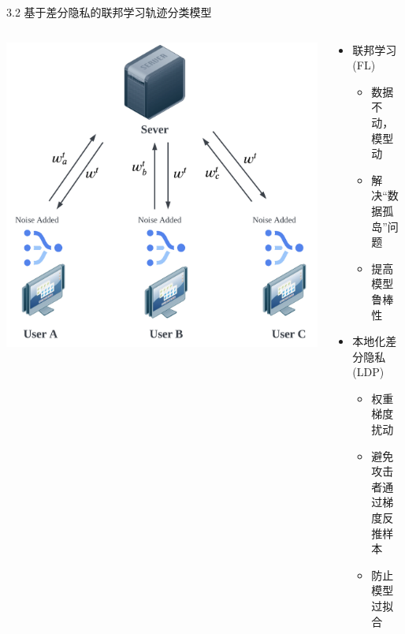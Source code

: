 \documentclass{sintefbeamer}
\begin{document}
\begin{frame}{3.2 基于差分隐私的联邦学习轨迹分类模型}
\begin{columns}
\begin{column}{0.55\textwidth}
\includegraphics[height=1\textheight]{images/fl}
\end{column}
\begin{column}{0.45\textwidth}
\begin{itemize}
  \item[Tech 1] 联邦学习(FL)
  \begin{itemize}
   \item 数据不动，模型动
   \item 解决“数据孤岛”问题
   \item 提高模型鲁棒性
  \end{itemize}
  \item[Tech 2] 本地化差分隐私(LDP)
  \begin{itemize}
  \item 权重梯度扰动
  \item 避免攻击者通过梯度反推样本
  \item 防止模型过拟合
  \end{itemize}
 \end{itemize}
\end{column}
\end{columns}
\end{frame}
\end{document}

